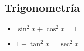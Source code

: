 \documentclass[10pt]{article}
\begin{document}
\begin{multicols}{3}
\section*{Trigonometría}
\begin{itemize}
    \item $\sin^2 x + \cos^2 x = 1$
    \item $1 + \tan^2 x = \sec^2 x$
\end{itemize}


\end{multicols}
\end{document}
